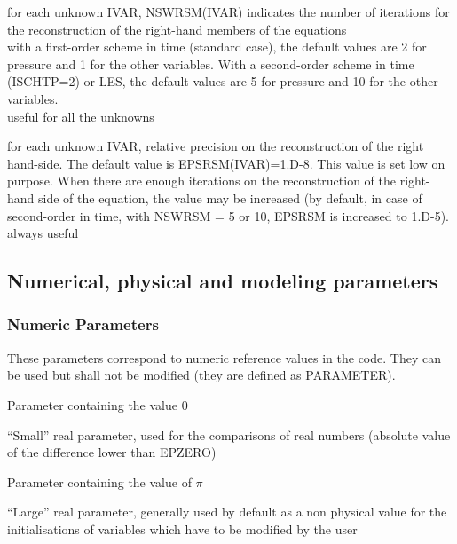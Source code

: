 {for each unknown IVAR, NSWRSM(IVAR) indicates the number of iterations for the
reconstruction of the right-hand members of the equations\\
with a first-order scheme in time
(standard case), the default values are 2 for pressure and 1 for the
other variables. With a second-order scheme in time (ISCHTP=2) or LES, the
default values are 5 for pressure and 10 for the other variables.\\
useful for all the unknowns}

{for each unknown IVAR, relative precision on the reconstruction of the
right hand-side. The default value is EPSRSM(IVAR)=1.D-8. This value is set low
on purpose. When there are enough iterations on the reconstruction of the
right-hand side of the equation,
the value may be increased (by default, in case of second-order in time,
with NSWRSM = 5 or 10, EPSRSM is increased to 1.D-5).\\
always useful}


\subsection{Numerical, physical and modeling parameters}
\subsubsection{Numeric Parameters}

These parameters correspond to numeric reference values in the code.
They can be used but shall not be modified (they are defined as PARAMETER).

{Parameter containing the value 0}

{``Small'' real parameter, used for the comparisons of real numbers (absolute
value of the difference lower than EPZERO)}

{Parameter containing the value of $\pi$}

{``Large'' real parameter, generally used by default as a non physical value for
the initialisations of variables which have to be modified by the user}

